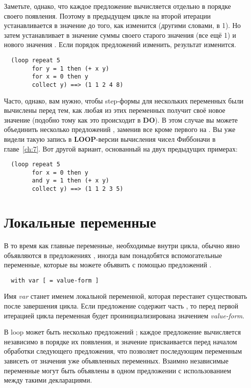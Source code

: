 Заметьте, однако, что каждое предложение  вычисляется отдельно в порядке своего
появления. Поэтому в предыдущем цикле на второй итерации  устанавливается в
значение  до того, как  изменится (другими словами, в 1). Но 
затем устанавливает в значение суммы своего старого значения (все ещё 1) и нового значения
. Если порядок предложений  изменить, результат изменится.

\begin{lstlisting}
  (loop repeat 5
        for y = 1 then (+ x y)
        for x = 0 then y
        collect y) ==> (1 1 2 4 8)
\end{lstlisting}

Часто, однако, вам нужно, чтобы step-формы для нескольких переменных были вычислены перед
тем, как любая из этих переменных получит своё новое значение (подобно тому как это
происходит в \textbf{DO}). В этом случае вы можете объединить несколько предложений
, заменив все кроме первого  на . Вы уже видели такую запись
в \textbf{LOOP}-версии вычисления чисел Фиббоначи в главе~\ref{ch:7}. Вот другой вариант,
основанный на двух предыдущих примерах:

\begin{lstlisting}
  (loop repeat 5 
        for x = 0 then y
        and y = 1 then (+ x y)
        collect y) ==> (1 1 2 3 5)
\end{lstlisting}

\section{Локальные переменные}

В то время как главные переменные, необходимые внутри цикла, обычно явно объявляются в
предложениях , иногда вам понадобятся вспомогательные переменные, которые вы
можете объявить с помощью предложений .

\begin{lstlisting}
  with var [ = value-form ]
\end{lstlisting}

Имя \textit{var} станет именем локальной переменной, которая перестанет существовать после
завершения цикла. Если предложение  содержит часть , то
перед первой итерацией цикла переменная будет проинициализирована значением
\textit{value-form}.

В loop может быть несколько предложений ; каждое предложение вычисляется
независимо в порядке их появления, и значение присваивается перед началом обработки
следующего предложения, что позволяет последующим переменным зависеть от значения уже
объявленных переменных. Взаимно независимые переменные могут быть объявлены в одном
предложении  с использованием  между такими декларациями.

